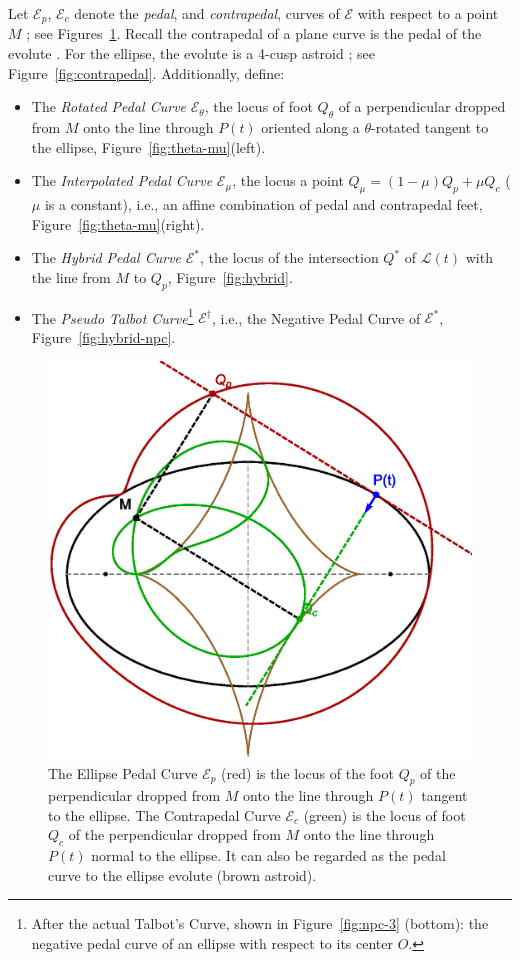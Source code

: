 Let $\mathcal{E}_p$, $\mathcal{E}_c$ denote the {\em pedal}, and {\em contrapedal}, curves of $\mathcal{E}$ with respect to a point $M$ \cite{stachel2019-conics}; see Figures~\ref{fig:pedal-cp}. Recall the contrapedal of a plane curve is the pedal of the evolute \cite[Contrapedal]{mw}. For the ellipse, the evolute is a 4-cusp astroid \cite[Ellipse Evolute]{mw}; see Figure~\ref{fig:contrapedal}.  Additionally, define:

\begin{itemize}
    \item The {\em Rotated Pedal Curve} $\mathcal{E}_{\theta}$, the locus of foot $Q_{\theta}$ of a perpendicular dropped from $M$ onto the line through $P(t)$ oriented along a $\theta$-rotated tangent to the ellipse, Figure~\ref{fig:theta-mu}(left).
    \item The {\em Interpolated Pedal Curve} $\mathcal{E}_{\mu}$, the locus a point $Q_{\mu}=(1-\mu)Q_p+{\mu}Q_c$ ($\mu$ is a constant), i.e., an affine combination of pedal and contrapedal feet, Figure~\ref{fig:theta-mu}(right).
    \item The {\em Hybrid Pedal Curve} $\mathcal{E}^*$, the locus of the intersection $Q^*$ of $\mathcal{L}(t)$ with the line from $M$ to $Q_p$, Figure~\ref{fig:hybrid}.
    \item The {\em Pseudo Talbot Curve}\footnote{After the actual Talbot's Curve, shown in Figure~\ref{fig:npc-3} (bottom): the negative pedal curve of an ellipse with respect to its center $O$.} $\mathcal{E}^\dagger$, i.e., the Negative Pedal Curve of $\mathcal{E}^*$, Figure~\ref{fig:hybrid-npc}.
\end{itemize}

\begin{figure}
    \centering
    \includegraphics[width=.7\textwidth]{pics/0010_ped_cp.eps}
    \caption{The Ellipse Pedal Curve $\mathcal{E}_p$ (red) is the locus of the foot $Q_p$ of the perpendicular dropped from $M$ onto the line through $P(t)$ tangent to the ellipse. The Contrapedal Curve $\mathcal{E}_c$ (green) is the locus of foot $Q_c$ of the perpendicular dropped from $M$ onto the line through $P(t)$ normal to the ellipse. It can also be regarded as the pedal curve to the ellipse evolute (brown astroid).}
    \label{fig:pedal-cp}
\end{figure}

